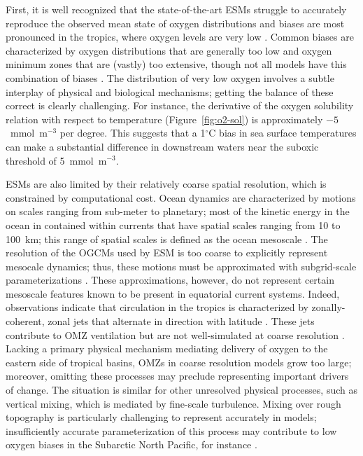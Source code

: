 \documentclass[draft,linenumbers]{report_chapter}
\begin{document}
First, it is well recognized that the state-of-the-art ESMs struggle to accurately reproduce the observed mean state of oxygen distributions and biases are most pronounced in the tropics, where oxygen levels are very low \citep{Bopp-Resplandy-etal-2013}.
Common biases are characterized by oxygen distributions that are generally too low and oxygen minimum zones that are (vastly) too extensive, though not all models have this combination of biases \citep{Bopp-Resplandy-etal-2013}.
The distribution of very low oxygen involves a subtle interplay of physical and biological mechanisms; getting the balance of these correct is clearly challenging.
For instance, the derivative of the oxygen solubility relation with respect to temperature (Figure~\ref{fig:o2-sol}) is approximately $-5$~mmol~m$^{-3}$ per degree.
This suggests that a 1$^\circ$C bias in sea surface temperatures can make a substantial difference in downstream waters near the suboxic threshold of 5~mmol~m$^{-3}$.

ESMs are also limited by their relatively coarse spatial resolution, which is constrained by computational cost.
Ocean dynamics are characterized by motions on scales ranging from sub-meter to planetary; most of the kinetic energy in the ocean in contained within currents that have spatial scales ranging from 10 to 100~km; this range of spatial scales is defined as the ocean mesoscale \citep{Stammer-1997}.
The resolution of the OGCMs used by ESM is too coarse to explicitly represent mesocale dynamics; thus, these motions must be approximated with subgrid-scale parameterizations \citep[e.g.,][]{Gent-McWilliams-1990}.
These approximations, however, do not represent certain mesoscale features known to be present in equatorial current systems.
Indeed, observations indicate that circulation in the tropics is characterized by zonally-coherent, zonal jets that alternate in direction with latitude \citep{Cravatte-Kessler-etal-2012}.
These jets contribute to OMZ ventilation but are not well-simulated at coarse resolution \citep{Brandt-Hormann-etal-2008,Brandt-Greatbatch-etal-2012,Dietze-Loeptien-2013,Getzlaff-Dietze-2013,Duteil-Schwarzkopf-etal-2014}.
Lacking a primary physical mechanism mediating delivery of oxygen to the eastern side of tropical basins, OMZs in coarse resolution models grow too large; moreover, omitting these processes may preclude representing important drivers of change.
The situation is similar for other unresolved physical processes, such as vertical mixing, which is mediated by fine-scale turbulence.
Mixing over rough topography is particularly challenging to represent accurately in models; insufficiently accurate parameterization of this process may contribute to low oxygen biases in the Subarctic North Pacific, for instance \citep{Nakamura-Toyoda-etal-2006}.
\end{document}
